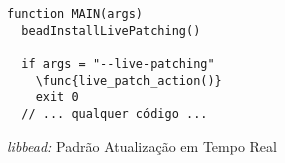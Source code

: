 \begin{pseudocode}
\begin{lstlisting}[language=pseudocode, style=pseudocode]
function MAIN(args)
  beadInstallLivePatching()

  if args = "--live-patching"
    \func{live_patch_action()}
    exit 0
  // ... qualquer código ...
\end{lstlisting}

  \caption{\emph{libbead:} Padrão Atualização em Tempo Real}
  \label{alg:beadLivePatch}
\end{pseudocode}
